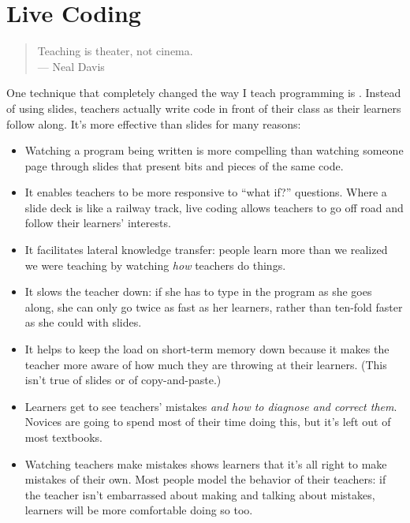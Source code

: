 \section{Live Coding}\label{s:performance-live}

\begin{quote}

  Teaching is theater, not cinema. \\
  --- Neal Davis

\end{quote}

One technique that completely changed the way I teach programming is
. Instead of using slides,
teachers actually write code in front of their class as their learners
follow along. It's more effective than slides for many reasons:

\begin{itemize}
\item
  Watching a program being written is more compelling than watching
  someone page through slides that present bits and pieces of the same
  code.
\item
  It enables teachers to be more responsive to ``what if?'' questions.
  Where a slide deck is like a railway track, live coding allows
  teachers to go off road and follow their learners' interests.
\item
  It facilitates lateral knowledge transfer: people learn more than we
  realized we were teaching by watching \emph{how} teachers do things.
\item
  It slows the teacher down: if she has to type in the program as she
  goes along, she can only go twice as fast as her learners, rather
  than ten-fold faster as she could with slides.
\item
  It helps to keep the load on short-term memory down because it makes
  the teacher more aware of how much they are throwing at their
  learners. (This isn't true of slides or of copy-and-paste.)
\item
  Learners get to see teachers' mistakes \emph{and how to diagnose and
  correct them}. Novices are going to spend most of their time doing
  this, but it's left out of most textbooks.
\item
  Watching teachers make mistakes shows learners that it's all right
  to make mistakes of their own. Most people model the behavior of
  their teachers: if the teacher isn't embarrassed about making and
  talking about mistakes, learners will be more comfortable doing so
  too.
\end{itemize}

